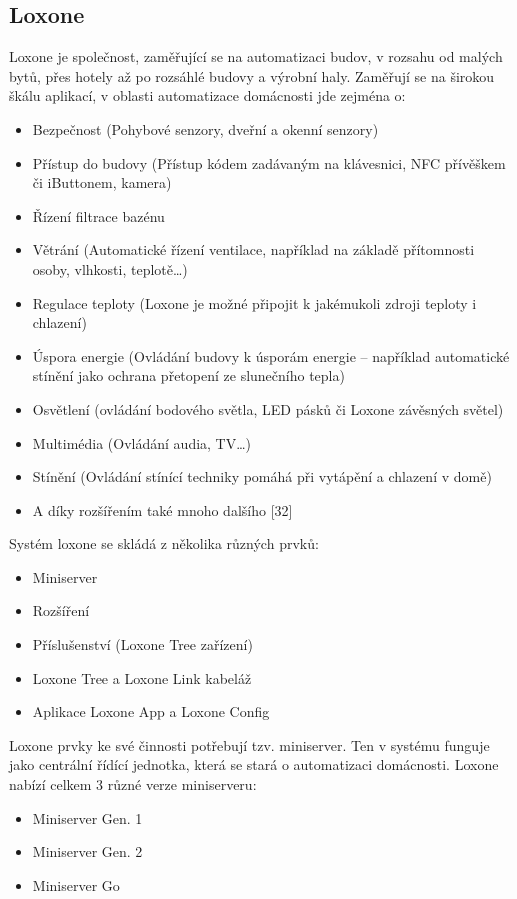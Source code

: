 \subsection*{Loxone}
Loxone je společnost, zaměřující se na automatizaci budov, v rozsahu od malých bytů, přes hotely až po rozsáhlé budovy a výrobní haly. Zaměřují se na širokou škálu aplikací, v oblasti automatizace domácnosti jde zejména o:
\begin{itemize}
\item Bezpečnost (Pohybové senzory, dveřní a okenní senzory)
\item Přístup do budovy (Přístup kódem zadávaným na klávesnici, NFC přívěškem či iButtonem, kamera)
\item Řízení filtrace bazénu
\item Větrání (Automatické řízení ventilace, například na základě přítomnosti osoby, vlhkosti, teplotě…)
\item Regulace teploty (Loxone je možné připojit k jakémukoli zdroji teploty i chlazení)
\item Úspora energie (Ovládání budovy k úsporám energie – například automatické stínění jako ochrana přetopení ze slunečního tepla)
\item Osvětlení (ovládání bodového světla, LED pásků či Loxone závěsných světel)
\item Multimédia (Ovládání audia, TV…)
\item Stínění (Ovládání stínící techniky pomáhá při vytápění a chlazení v domě)
\item A díky rozšířením také mnoho dalšího [32]
\end{itemize}
Systém loxone se skládá z několika různých prvků:

\begin{itemize}
\item Miniserver
\item Rozšíření
\item Příslušenství (Loxone Tree zařízení)
\item Loxone Tree a Loxone Link kabeláž
\item Aplikace Loxone App a Loxone Config
\end{itemize}
Loxone prvky ke své činnosti potřebují tzv. miniserver. Ten v systému funguje jako centrální řídící jednotka, která se stará o automatizaci domácnosti. Loxone nabízí celkem 3 různé verze miniserveru:

\begin{itemize}
\item Miniserver Gen. 1
\item Miniserver Gen. 2
\item Miniserver Go
\end{itemize}


